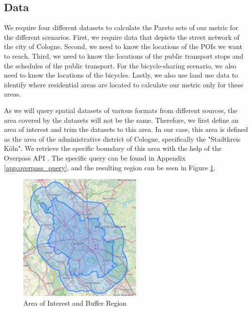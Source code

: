 \subsection{Data}
\label{subs:data}

We require four different datasets to calculate the Pareto sets of our metric for the different scenarios.
First, we require data that depicts the street network of the city of Cologne.
Second, we need to know the locations of the POIs we want to reach.
Third, we need to know the locations of the public transport stops and the schedules of the public transport.
For the bicycle-sharing scenario, we also need to know the locations of the bicycles.
Lastly, we also use land use data to identify where residential areas are located to calculate our metric only for these areas.

As we will query spatial datasets of various formats from different sources, the area covered by the datasets will not be the same.
Therefore, we first define an area of interest and trim the datasets to this area.
In our case, this area is defined as the area of the administrative district of Cologne, specifically the "Stadtkreis Köln".
We retrieve the specific boundary of this area with the help of the Overpass API .
The specific query can be found in Appendix \ref{app:overpass_query}, and the resulting region can be seen in Figure \ref{fig:area_plus_buffer}.

\begin{figure}
  \begin{center}
    \includegraphics[width=0.55\textwidth]{Figures/experiment/area_plus_buffer.png}
  \end{center}
  \caption{Area of Interest and Buffer Region}\label{fig:area_plus_buffer}
\end{figure}


